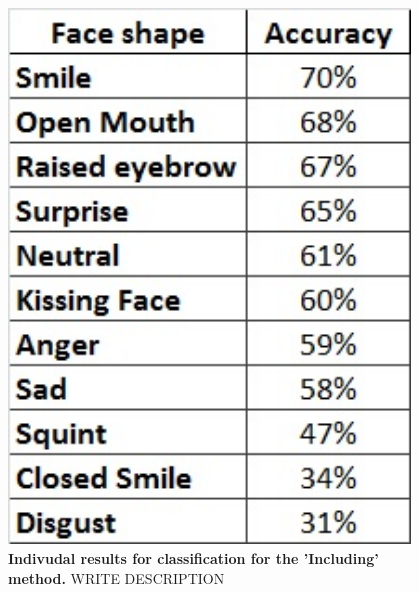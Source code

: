 \documentclass[]{article}
\begin{document}
\begin{figure}[ht]
\begin{center}
\vspace{-3mm}
\includegraphics[width=0.95\textwidth]{figures/rankIncluding.jpg}
\end{center}
\caption{\textbf{Indivudal results for classification for the 'Including'
method.} WRITE DESCRIPTION }
\label{raIncluding}
\end{figure}
\end{document}

